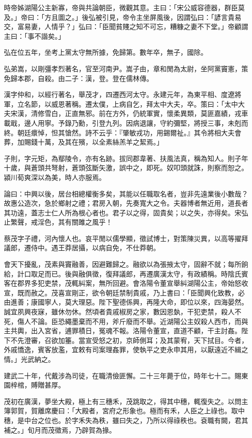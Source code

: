 \begin{pinyinscope}
時帝姊湖陽公主新寡，帝與共論朝臣，微觀其意。主曰：「宋公威容德器，群臣莫及。」帝曰：「方且圖之。」後弘被引見，帝令主坐屏風後，因謂弘曰：「諺言貴易交，富易妻，人情乎？」弘曰：「臣聞貧賤之知不可忘，糟糠之妻不下堂。」帝顧謂主曰：「事不諧矣。」

弘在位五年，坐考上黨太守無所據，免歸第。數年卒，無子，國除。

弘弟嵩，以剛彊孝烈著名，官至河南尹。嵩子由，章和閒為太尉，坐阿黨竇憲，策免歸本郡，自殺。由二子：漢，登。登在儒林傳。

漢字仲和，以經行著名，舉茂才，四遷西河太守。永建元年，為東平相、度遼將軍，立名節，以威恩著稱。遷太僕，上病自乞，拜太中大夫，卒。策曰：「太中大夫宋漢，清修雪白，正直無邪。前在方外，仍統軍實，懷柔異類，莫匪嘉績，戎車載戢，邊人用寧。予錄乃勳，引登九列。因病退讓，守約彌堅，將授三事，未剋而終。朝廷癏悼，怛其愴然。詩不云乎：『肇敏戎功，用錫爾祉。』其令將相大夫會葬，加賜錢十萬，及其在殯，以全素絲羔羊之絜焉。」

子則，字元矩，為鄢陵令，亦有名跡。拔同郡韋著、扶風法真，稱為知人。則子年十歲，與蒼頭共弩射，蒼頭弦斷矢激，誤中之，即死。奴叩頭就誅，則察而恕之。潁川荀爽深以為美，時人亦服焉。

論曰：中興以後，居台相總權衡多矣，其能以任職取名者，豈非先遠業後小數哉？故惠公造次，急於鄉射之禮；君房入朝，先奏寬大之令。夫器博者無近用，道長者其功遠，蓋志士仁人所為根心者也。君子以之得，固貴矣；以之失，亦得矣。宋弘止繁聲，戒淫色，其有關雎之風乎！

蔡茂字子禮，河內懷人也。哀平閒以儒學顯，徵試博士，對策陳災異，以高等擢拜議郎，遷侍中。遇王莽居攝，以病自免，不仕莽朝。

會天下擾亂，茂素與竇融善，因避難歸之。融欲以為張掖太守，固辭不就；每所餉給，計口取足而已。後與融俱徵，復拜議郎，再遷廣漢太守，有政績稱。時陰氏賓客在郡界多犯吏禁，茂輒糾案，無所回避。會洛陽令董宣舉糾湖陽公主，帝始怒收宣，既而赦之。茂喜宣剛正，欲令朝廷禁制貴戚，乃上書曰：「臣聞興化致教，必由進善；康國寧人，莫大理惡。陛下聖德係興，再隆大命，即位以來，四海晏然。誠宜夙興夜寐，雖休勿休。然頃者貴戚椒房之家，數因恩埶，干犯吏禁，殺人不死，傷人不論。臣恐繩墨棄而不用，斧斤廢而不舉。近湖陽公主奴殺人西市，而與主共輿，出入宮省，逋罪積日，冤魂不報。洛陽令董宣，直道不顧，干主討姦。陛下不先澄審，召欲加箠。當宣受怒之初，京師側耳；及其蒙宥，天下拭目。今者，外戚憍逸，賓客放濫，宜敕有司案理姦罪，使執平之吏永申其用，以厭遠近不緝之情。」光武納之。

建武二十年，代戴涉為司徒，在職清儉匪懈。二十三年薨于位，時年七十二。賜東園梓棺，賻贈甚厚。

茂初在廣漢，夢坐大殿，極上有三穗禾，茂跳取之，得其中穗，輒復失之。以問主簿郭賀，賀離席慶曰：「大殿者，宮府之形象也。極而有禾，人臣之上祿也。取中穗，是中台之位也。於字禾失為秩，雖曰失之，乃所以得祿秩也。袞職有闕，君其補之。」旬月而茂徵焉，乃辟賀為掾。


\end{pinyinscope}
